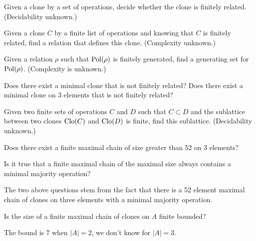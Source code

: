\begin{question}
Given a clone by a set of operations, decide whether the clone is finitely related. (Decidability unknown.) 
\end{question}

\begin{question}
Given a clone $C$ by a finite list of operations and knowing that $C$ is
finitely related, find a relation that defines this clone. (Complexity unknown.)
\end{question}
\begin{question}
  Given a relation $\rho$ such that $\operatorname{Pol}(\rho)$ is finitely generated, find
  a generating set for $\operatorname{Pol}(\rho)$. (Complexity is unknown.)
\end{question}

\begin{question}
  Does there exist a minimal clone that is not finitely related? Does 
  there exist a minimal clone on 3 elements that is not finitely
  related?
\end{question}

\begin{question}
  Given two finite sets of operations $C$ and $D$ such
  that $C\subset D$ and the sublattice between two clones
  $\operatorname{Clo}(C)$ and $\operatorname{Clo}(D)$ is finite, find this sublattice. (Decidability
  unknown.)
\end{question}

\begin{question}
  Does there exist a finite maximal chain of size greater than 52 on 3
  elements?
\end{question}
\begin{question}
  Is it true that a finite maximal chain of the maximal size always
  contains a minimal majority operation?
\end{question}
\begin{context}
  The two above questions stem from the fact that there is a 52 element maximal
  chain of clones on three elements with a minimal majority operation.
\end{context}

\begin{question}
  Is the size of a finite maximal chain of clones on $A$ finite bounded?
\end{question}
\begin{context}
  The bound is 7 when $|A|=2$, we don't know for $|A|=3$.
\end{context}


